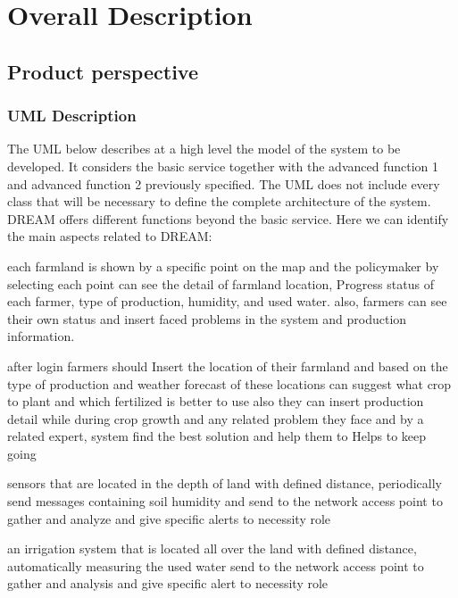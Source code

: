 \section{Overall Description}
\subsection{ Product perspective}
\subsubsection{UML Description}
The UML below describes at a high level the model of the system to be developed. It considers the basic
service together with the advanced function 1 and advanced function 2 previously specified. The UML does
not include every class that will be necessary to define the complete architecture of the system.
DREAM offers different functions beyond the basic service.
Here we can identify the main aspects related to DREAM:\newline

each farmland is shown by a specific point on the map and the policymaker by selecting each point can see the detail of farmland location, Progress status of each farmer, type of production, humidity, and used water. also, farmers can see their own status and insert faced problems in the system and production information. \newline


after login farmers should Insert the location of  their farmland and based on the type of production and weather forecast of these locations can suggest what crop to plant and which fertilized is better  to use also they can insert production detail while during crop growth and any related problem they face and by a related expert, system find the best solution and help them to Helps to keep going \newline


sensors that are located in the depth of land with defined distance, periodically send messages containing soil humidity and send to the network access point to gather and analyze and give specific alerts to necessity role\newline

an irrigation system  that is located all over the land with  defined distance, automatically measuring the used water send to the network access point to gather and analysis and give specific alert to necessity role \newline

